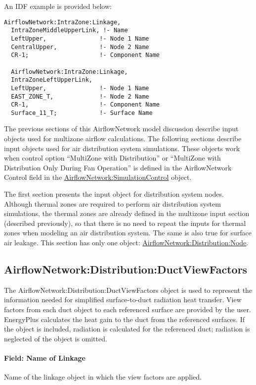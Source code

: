 An IDF example is provided below:

\begin{lstlisting}
AirflowNetwork:IntraZone:Linkage,
  IntraZoneMiddleUpperLink, !- Name
  LeftUpper,               !- Node 1 Name
  CentralUpper,            !- Node 2 Name
  CR-1;                    !- Component Name

  AirflowNetwork:IntraZone:Linkage,
  IntraZoneLeftUpperLink,
  LeftUpper,               !- Node 1 Name
  EAST_ZONE_T,             !- Node 2 Name
  CR-1,                    !- Component Name
  Surface_11_T;            !- Surface Name
\end{lstlisting}

The previous sections of this AirflowNetwork model discussion describe input objects used for multizone airflow calculations. The following sections describe input objects used for air distribution system simulations. These objects work when control option ``MultiZone with Distribution'' or ``MultiZone with Distribution Only During Fan Operation'' is defined in the AirflowNetwork Control field in the \hyperref[airflownetworksimulationcontrol]{AirflowNetwork:\hyperref[simulationcontrol]{SimulationControl}} object.

The first section presents the input object for distribution system nodes. Although thermal zones are required to perform air distribution system simulations, the thermal zones are already defined in the multizone input section (described previously), so that there is no need to repeat the inputs for thermal zones when modeling an air distribution system. The same is also true for surface air leakage. This section has only one object: \hyperref[airflownetworkdistributionnode]{AirflowNetwork:Distribution:Node}.

\subsection{AirflowNetwork:Distribution:DuctViewFactors}\label{airflownetworkdistributionductviewfactor}
The AirflowNetwork:Distribution:DuctViewFactors object is used to represent the information needed for simplified surface-to-duct radiation heat transfer. View factors from each duct object to each referenced surface are provided by the user. EnergyPlus calculates the heat gain to the duct from the referenced surfaces. If the object is included, radiation is calculated for the referenced duct; radiation is neglected of the object is omitted.

\paragraph{Field: Name of Linkage}\label{field-name-of-linkage}
Name of the linkage object in which the view factors are applied.

